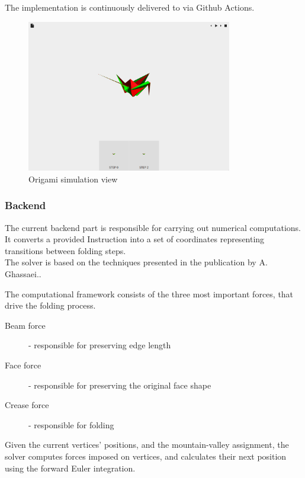 The implementation is continuously delivered to  via Github Actions.


\begin{figure}[H]
\caption{Origami simulation view}
  \centering
    \includegraphics[width=0.8\textwidth]{assets/prototype-front.png}
\end{figure}

\subsubsection{Backend}

The current backend part is responsible for carrying out numerical computations.
It converts a provided Instruction into a set of coordinates representing
transitions between folding steps.\\

The solver is based on the techniques presented in the publication by A. Ghassaei.\cite{origami-simulator:paper}.

The computational framework consists of the three most important forces,
that drive the folding process.

\begin{description}
	\item[Beam force] - responsible for preserving edge length
	\item[Face force] - responsible for preserving the original face shape
	\item[Crease force] - responsible for folding
\end{description}

Given the current vertices' positions, and the mountain-valley assignment,
the solver computes forces imposed on vertices, and calculates their next position
using the forward Euler integration.

